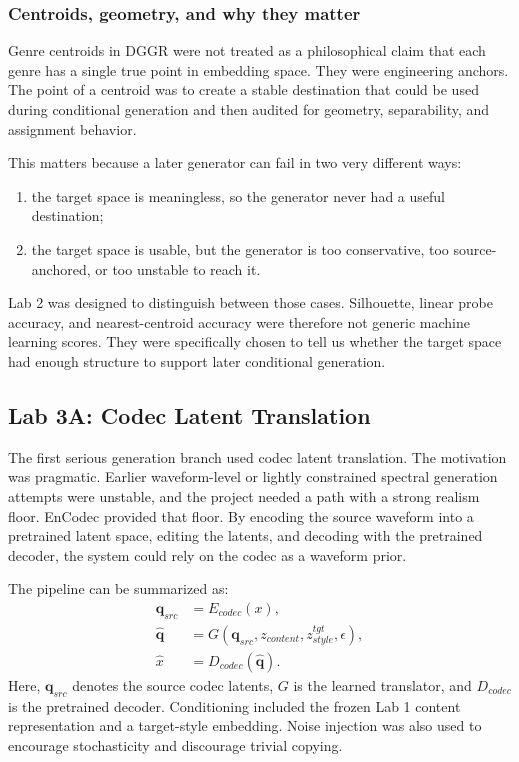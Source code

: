 \documentclass[conference]{IEEEtran}
\begin{document}
\subsubsection{Centroids, geometry, and why they matter}
Genre centroids in DGGR were not treated as a philosophical claim that each genre has a single true point in embedding space. They were engineering anchors. The point of a centroid was to create a stable destination that could be used during conditional generation and then audited for geometry, separability, and assignment behavior.

This matters because a later generator can fail in two very different ways:
\begin{enumerate}[leftmargin=1.5em]
    \item the target space is meaningless, so the generator never had a useful destination;
    \item the target space is usable, but the generator is too conservative, too source-anchored, or too unstable to reach it.
\end{enumerate}

Lab 2 was designed to distinguish between those cases. Silhouette, linear probe accuracy, and nearest-centroid accuracy were therefore not generic machine learning scores. They were specifically chosen to tell us whether the target space had enough structure to support later conditional generation.

\subsection{Lab 3A: Codec Latent Translation}
The first serious generation branch used codec latent translation. The motivation was pragmatic. Earlier waveform-level or lightly constrained spectral generation attempts were unstable, and the project needed a path with a strong realism floor. EnCodec provided that floor. By encoding the source waveform into a pretrained latent space, editing the latents, and decoding with the pretrained decoder, the system could rely on the codec as a waveform prior.

The pipeline can be summarized as:
\begin{equation}
\begin{aligned}
\mathbf{q}_{src} &= E_{codec}(x), \\
\hat{\mathbf{q}} &= G(\mathbf{q}_{src}, z_{content}, z_{style}^{tgt}, \epsilon), \\
\hat{x} &= D_{codec}(\hat{\mathbf{q}}).
\end{aligned}
\end{equation}
Here, $\mathbf{q}_{src}$ denotes the source codec latents, $G$ is the learned translator, and $D_{codec}$ is the pretrained decoder. Conditioning included the frozen Lab 1 content representation and a target-style embedding. Noise injection was also used to encourage stochasticity and discourage trivial copying.
\end{document}
